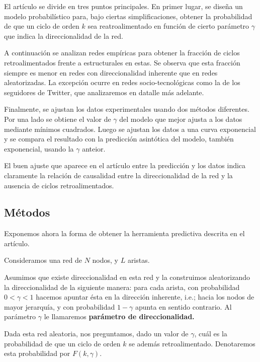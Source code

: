 \documentclass[1p]{elsarticle}
\begin{document}
    El artículo se divide en tres puntos principales.
    En primer lugar, se diseña un modelo probabilístico para, bajo ciertas simplificaciones, obtener la probabilidad de que un ciclo de orden $k$ sea reatroalimentado en función de cierto parámetro $\gamma$ que indica la direccionalidad de la red.

    A continuación se analizan redes empíricas para obtener la fracción de ciclos retroalimentados frente a estructurales en estas.
    Se observa que esta fracción siempre es menor en redes con direccionalidad inherente que en redes aleatorizadas. 
    La excepción ocurre en redes socio-tecnológicas como la de los seguidores de Twitter, que analizaremos en datalle más adelante.
 
    
    Finalmente, se ajustan los datos experimentales usando dos métodos diferentes.
    Por una lado se obtiene el valor de $\gamma$ del modelo que mejor ajusta a los datos mediante mínimos cuadrados.
    Luego se ajustan los datos a una curva exponencial y se compara el resultado con la predicción asintótica del modelo, también exponencial, usando la $\gamma$ anteior.

    El buen ajuste que aparece en el artículo entre la predicción y los datos indica claramente la relación de causalidad entre la direccionalidad de la red y la ausencia de ciclos retroalimentados.


\subsection{Métodos}
    Exponemos ahora la forma de obtener la herramienta predictiva descrita en el artículo.

    Consideramos una red de $N$ nodos, y $L$ aristas.
     
    Asumimos que existe direccionalidad en esta red y la construimos aleatorizando la direccionalidad de la siguiente manera:
    para cada arista, con probabilidad $0<\gamma<1$ hacemos apuntar ésta en la dirección inherente, i.e.; hacia los nodos de mayor jerarquía, y con probabilidad $1-\gamma$ apunta en sentido contrario.
    Al parámetro $\gamma$ le llamaremos \textbf{parámetro de direccionalidad.}

    Dada esta red aleatoria, nos preguntamos, dado un valor de $\gamma$, cuál es la probabilidad de que un ciclo de orden $k$ se además retroalimentado. 
    Denotaremos esta probabilidad por $F(k, \gamma)$.
\end{document}
